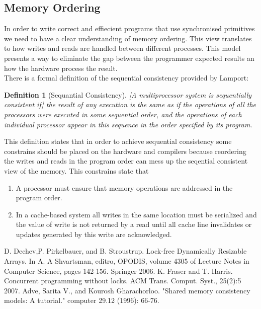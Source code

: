 \documentclass[a4paper, 11pt]{article}
\theoremstyle{nonumberplain}
\newtheorem{definition}{Definition}
\begin{document}
\subsection{Memory Ordering}
In order to write correct and effiecient programs that use synchronised
primitives we need to have a clear understanding of memory ordering. This view
translates to how writes and reads are handled between different processes.
This model presents a way to eliminate the gap between the programmer expected
results an how the hardware process the result. \\
There is a formal definition of the sequential consistency provided by
Lamport\cite{ordering}:

\begin{definition}[Sequantial Consistency]
    [A multiprocessor system is sequentially consistent if] the result of any
    execution is the same as if the operations of all the processors were
    executed in some sequential order, and the operations of each individual
    processor appear in this sequence in the order specified by its program.
\end{definition}

This definition states that in order to achieve sequential consistency some
constrains should be placed on the hardware and compilers because reordering
the writes and reads in the program order can mess up the seqential consistent
view of the memory. This constrains state that
\begin{enumerate}
    \item A processor must ensure that memory operations are addressed in the
        program order.
    \item In a cache-based system all writes in the same location must be
        serialized and the value of write is not returned by a read until all
        cache line invalidates or updates generated by this write are
        acknowledged.
\end{enumerate}


% 
\begin{thebibliography}{10}
        D. Dechev,P. Pirkelbauer, and B. Stroustrup.
        Lock-free Dynamically Resizable Arrays.
        In A. A Shvartsman, editro, OPODIS,
        volume 4305 of Lecture Notes in Computer Science,
        pages 142-156.
        Springer 2006.
        K. Fraser and T. Harris. Concurrent programming without locks.
        ACM Trans. Comput. Syst., 25(2):5 2007.
        Adve, Sarita V., and Kourosh Gharachorloo.
        "Shared memory consistency models: A tutorial."
        computer 29.12 (1996): 66-76.
\end{thebibliography}
\end{document}
